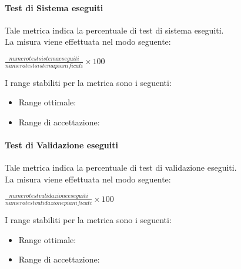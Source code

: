 			\paragraph{Test di Sistema eseguiti}
				Tale metrica indica la percentuale di test di sistema eseguiti.
\\La misura viene effettuata nel modo seguente:
			\begin{center}
			$\frac{numero test sistema eseguiti}{numero test sistema pianificati}\times100$
			\end{center}
			I range stabiliti per la metrica sono i seguenti:
			\begin{itemize}
					\item Range ottimale:
					\item Range di accettazione:
				\end{itemize}
				
			\paragraph{Test di Validazione eseguiti}
			Tale metrica indica la percentuale di test di validazione eseguiti.
\\La misura viene effettuata nel modo seguente:
			\begin{center}
			$\frac{numero test validazione eseguiti}{numero test validazione pianificati}\times100$
			\end{center}
			I range stabiliti per la metrica sono i seguenti:
			\begin{itemize}
					\item Range ottimale:
					\item Range di accettazione:
				\end{itemize}
				
